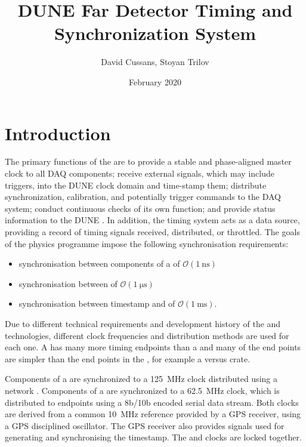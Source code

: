 \documentclass{article}
\title{DUNE Far Detector Timing and Synchronization System}
\author{David Cussans, Stoyan Trilov}
\date{February 2020}
\begin{document}
\maketitle

\section{Introduction}
\label{sec:intro}
The primary functions of the  are to provide a stable and phase-aligned master clock to all DAQ components; receive external signals, which may include triggers, into the DUNE clock domain and time-stamp them; distribute synchronization, calibration, and potentially trigger commands to the DAQ system; conduct continuous checks of its own function; and provide status information to the DUNE . In addition, the timing system acts as a data source, providing a record of timing signals received, distributed, or throttled. The goals of the  physics programme impose the following synchronisation requirements:

\begin{itemize}
    \item synchronisation between components of a  of $\mathcal{O}(\SI{1}{\ns})$
    \item synchronisation between  of $\mathcal{O}(\SI{1}{\us})$ 
    \item synchronisation between  timestamp and  of $\mathcal{O}(\SI{1}{\ms})$.
\end{itemize}

Due to different technical requirements and development history of the  and  technologies, different clock frequencies and distribution methods are used for each one. A  has many more timing endpoints than a  and many of the end points are simpler than the end points in the , for example a  versus  crate.

Components of a  are synchronized to a \SI{125}{\MHz} clock distributed using a  network \cite{wr_ohwr}. Components of a  are synchronized to a \SI{62.5}{\MHz} clock, which is distributed to  endpoints using a 8b/10b encoded serial data stream. Both clocks are derived from a common \SI{10}{\MHz} reference provided by a GPS receiver, using a GPS disciplined oscillator. The GPS receiver also provides  signals used for generating and synchronising the  timestamp. The  and  clocks are locked together.
\end{document}
